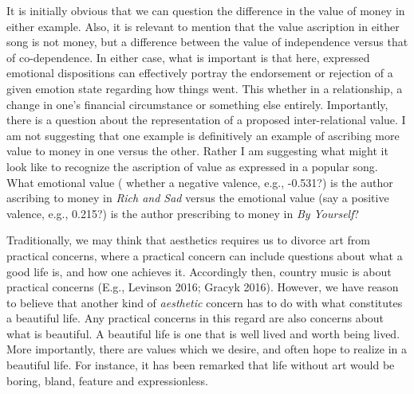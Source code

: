 \documentclass[12pt]{book}
\theoremstyle{definition}
\theoremstyle{remark}
\begin{document}
It is initially obvious that we can question the difference in the value of money in either example. Also, it is relevant to mention that the value ascription in either song is not money, but a difference between the value of independence versus that of co-dependence. In either case, what is important is that here, expressed emotional dispositions can effectively portray the endorsement or rejection of a given emotion state regarding how things went. This whether in a relationship, a change in one's financial circumstance or something else entirely. Importantly, there is a question about the representation of a proposed inter-relational value. I am not suggesting that one example is definitively an example of ascribing more value to money in one versus the other. Rather I am suggesting what might it look like to recognize the ascription of value as expressed in a popular song. What emotional value ( whether a negative valence, e.g., -0.531?) is the author ascribing to money in \emph{Rich and Sad} versus the emotional value (say a positive valence, e.g., 0.215?) is the author prescribing to money in \emph{By Yourself}?

Traditionally, we may think that aesthetics requires us to divorce art from practical concerns, where a practical concern can include questions about what a good life is, and how one achieves it. Accordingly then, country music is about practical concerns (E.g., Levinson 2016; Gracyk 2016). However, we have reason to believe that another kind of \emph{aesthetic} concern has to do with what constitutes a beautiful life. Any practical concerns in this regard are also concerns about what is beautiful. A beautiful life is one that is well lived and worth being lived. More importantly, there are values which we desire, and often hope to realize in a beautiful life. For instance, it has been remarked that life without art would be boring, bland, feature and expressionless.
\end{document}
